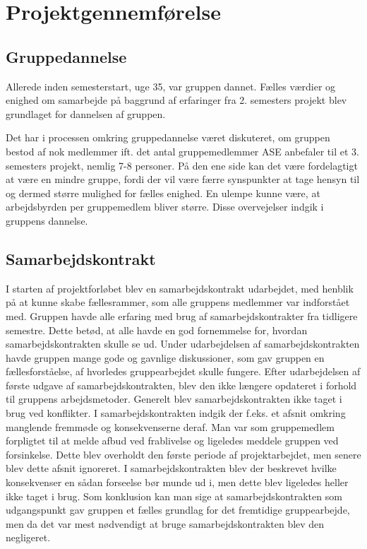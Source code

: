 \chapter{Projektgennemførelse}
\section{Gruppedannelse}
Allerede inden semesterstart, uge 35, var gruppen dannet. Fælles værdier og enighed om samarbejde på baggrund af erfaringer fra 2. semesters projekt
blev grundlaget for dannelsen af gruppen.

Det har i processen omkring gruppedannelse været diskuteret, om gruppen bestod af nok medlemmer ift. det antal gruppemedlemmer ASE anbefaler til et 3. semesters
projekt, nemlig 7-8 personer. På den ene side kan det være fordelagtigt at være en mindre gruppe, fordi der vil være færre synspunkter at tage hensyn til
og dermed større mulighed for fælles enighed. En ulempe kunne være, at arbejdsbyrden per gruppemedlem bliver større. Disse overvejelser indgik i gruppens dannelse.\\

\section{Samarbejdskontrakt}
I starten af projektforløbet blev en samarbejdskontrakt udarbejdet, med henblik på at kunne skabe fællesrammer, som alle gruppens medlemmer var indforstået med.
Gruppen havde alle erfaring med brug af samarbejdskontrakter fra tidligere semestre. Dette betød, at alle havde en god fornemmelse for, hvordan 
samarbejdskontrakten skulle se ud. Under udarbejdelsen af samarbejdskontrakten havde gruppen mange gode og gavnlige diskussioner, som gav gruppen en 
fællesforståelse, af hvorledes gruppearbejdet skulle fungere. 
Efter udarbejdelsen af første udgave af samarbejdskontrakten, blev den ikke længere opdateret i forhold til gruppens arbejdsmetoder. Generelt blev 
samarbejdskontrakten ikke taget i brug ved konflikter. I samarbejdskontrakten indgik der f.eks. et afsnit omkring manglende fremmøde og konsekvenserne deraf. 
Man var som gruppemedlem forpligtet til at melde afbud ved frablivelse og ligeledes meddele gruppen ved forsinkelse. Dette blev overholdt den første periode 
af projektarbejdet, men senere blev dette afsnit ignoreret. I samarbejdskontrakten blev der beskrevet hvilke konsekvenser en sådan forseelse bør munde ud i, 
men dette blev ligeledes heller ikke taget i brug. 
Som konklusion kan man sige at samarbejdskontrakten som udgangspunkt gav gruppen et fælles grundlag for det fremtidige gruppearbejde, men da det var mest
 nødvendigt at bruge samarbejdskontrakten blev den negligeret.
 
